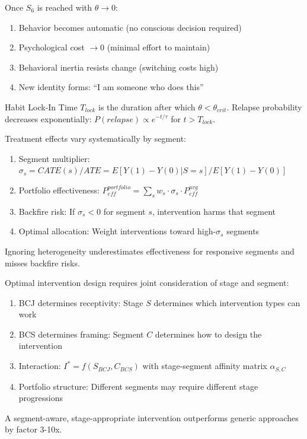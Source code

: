 \begin{theorem}
Once $S_6$ is reached with $\theta \to 0$:
\begin{enumerate}
\item Behavior becomes automatic (no conscious decision required)
\item Psychological cost $\to 0$ (minimal effort to maintain)
\item Behavioral inertia resists change (switching costs high)
\item New identity forms: ``I am someone who does this''
\end{enumerate}
Habit Lock-In Time $T_{lock}$ is the duration after which $\theta < \theta_{crit}$.
Relapse probability decreases exponentially: $P(relapse) \propto e^{-t/\tau}$ for $t > T_{lock}$.
\end{theorem}

\begin{theorem}
Treatment effects vary systematically by segment:
\begin{enumerate}
\item Segment multiplier: $\sigma_s = CATE(s)/ATE = E[Y(1)-Y(0)|S=s]/E[Y(1)-Y(0)]$
\item Portfolio effectiveness: $P_{eff}^{portfolio} = \sum_s w_s \cdot \sigma_s \cdot P_{eff}^{avg}$
\item Backfire risk: If $\sigma_s < 0$ for segment $s$, intervention harms that segment
\item Optimal allocation: Weight interventions toward high-$\sigma_s$ segments
\end{enumerate}
Ignoring heterogeneity underestimates effectiveness for responsive segments and misses backfire risks.
\end{theorem}

\begin{theorem}
Optimal intervention design requires joint consideration of stage and segment:
\begin{enumerate}
\item BCJ determines receptivity: Stage $S$ determines which intervention types can work
\item BCS determines framing: Segment $C$ determines how to design the intervention
\item Interaction: $I^* = f(S_{BCJ}, C_{BCS})$ with stage-segment affinity matrix $\alpha_{S,C}$
\item Portfolio structure: Different segments may require different stage progressions
\end{enumerate}
A segment-aware, stage-appropriate intervention outperforms generic approaches by factor 3-10x.
\end{theorem}

